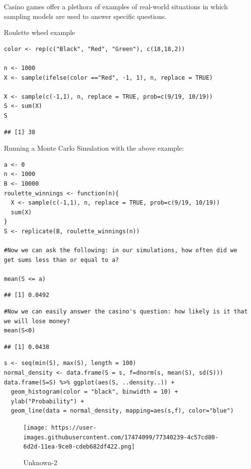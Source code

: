 \documentclass[
]{article}
\begin{document}
Casino games offer a plethora of examples of real-world situations in
which sampling models are used to answer specific questions.

Roulette wheel example

\begin{verbatim}
color <- rep(c("Black", "Red", "Green"), c(18,18,2))

n <- 1000
X <- sample(ifelse(color =="Red", -1, 1), n, replace = TRUE)

X <- sample(c(-1,1), n, replace = TRUE, prob=c(9/19, 10/19))
S <- sum(X)
S
\end{verbatim}

\begin{verbatim}
## [1] 38
\end{verbatim}

Running a Monte Carlo Simulation with the above example:

\begin{verbatim}
a <- 0
n <- 1000
B <- 10000
roulette_winnings <- function(n){
  X <- sample(c(-1,1), n, replace = TRUE, prob=c(9/19, 10/19))
  sum(X)
}
S <- replicate(B, roulette_winnings(n))

#Now we can ask the following: in our simulations, how often did we get sums less than or equal to a?

mean(S <= a)
\end{verbatim}

\begin{verbatim}
## [1] 0.0492
\end{verbatim}

\begin{verbatim}
#Now we can easily answer the casino's question: how likely is it that we will lose money?
mean(S<0)
\end{verbatim}

\begin{verbatim}
## [1] 0.0438
\end{verbatim}

\begin{verbatim}
s <- seq(min(S), max(S), length = 100)
normal_density <- data.frame(S = s, f=dnorm(s, mean(S), sd(S)))
data.frame(S=S) %>% ggplot(aes(S, ..density..)) +
  geom_histogram(color = "black", binwidth = 10) +
  ylab("Probability") +
  geom_line(data = normal_density, mapping=aes(s,f), color="blue")
\end{verbatim}

\begin{figure}
\centering
\texttt{[image: https://user-images.githubusercontent.com/17474099/77340239-4c57cd80-6d2d-11ea-9ce0-cdeb682df422.png]}
\caption{Unknown-2}
\end{figure}
\end{document}
